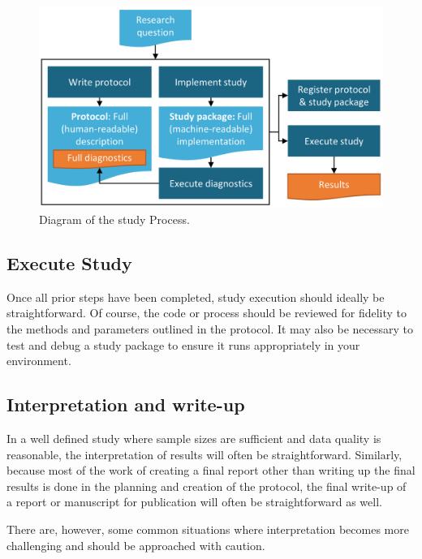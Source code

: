 \documentclass[11pt]{book}
\theoremstyle{definition}
\theoremstyle{definition}
\theoremstyle{definition}
\theoremstyle{remark}
\begin{document}
\begin{figure}

{\centering \includegraphics[width=0.9\linewidth]{images/StudySteps/studyProcess} 

}

\caption{Diagram of the study Process.}\label{fig:studyProcess}
\end{figure}

\hypertarget{execute-study}{%
\subsection{Execute Study}\label{execute-study}}

Once all prior steps have been completed, study execution should ideally be straightforward. Of course, the code or process should be reviewed for fidelity to the methods and parameters outlined in the protocol. It may also be necessary to test and debug a study package to ensure it runs appropriately in your environment.

\hypertarget{interpretation-and-write-up}{%
\subsection{Interpretation and write-up}\label{interpretation-and-write-up}}

In a well defined study where sample sizes are sufficient and data quality is reasonable, the interpretation of results will often be straightforward. Similarly, because most of the work of creating a final report other than writing up the final results is done in the planning and creation of the protocol, the final write-up of a report or manuscript for publication will often be straightforward as well.

There are, however, some common situations where interpretation becomes more challenging and should be approached with caution.
\end{document}

